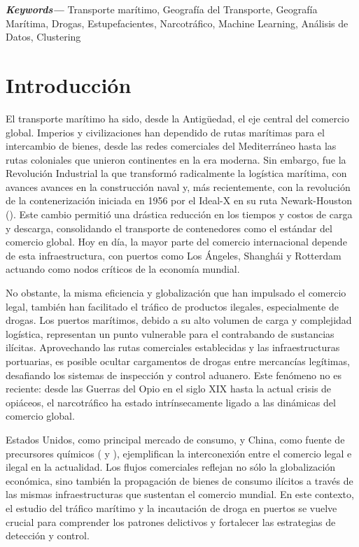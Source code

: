 \documentclass[12pt]{article}
\providecommand{\keywords}[1]
{
	\small	
	\textbf{\textit{Keywords---}} #1
}
\begin{document}
\keywords{Transporte marítimo, Geografía del Transporte, Geografía Marítima, Drogas, Estupefacientes, Narcotráfico, Machine Learning, Análisis de Datos, Clustering}

\newpage
\tableofcontents

\newpage

\listoffigures

\newpage

\listoftables

\newpage

\section{\label{intro}Introducción}
	El transporte marítimo ha sido, desde la Antigüedad, el eje central del comercio global. Imperios y civilizaciones han dependido de rutas marítimas para el intercambio de bienes, desde las redes comerciales del Mediterráneo hasta las rutas coloniales que unieron continentes en la era moderna. Sin embargo, fue la Revolución Industrial la que transformó radicalmente la logística marítima, con avances avances en la construcción naval y, más recientemente, con la revolución de la contenerización iniciada en 1956 por el Ideal-X en su ruta Newark-Houston (\cite{wired2012container}). Este cambio permitió una drástica reducción en los tiempos y costos de carga y descarga, consolidando el transporte de contenedores como el estándar del comercio global. Hoy en día, la mayor parte del comercio internacional depende de esta infraestructura, con puertos como Los Ángeles, Shanghái y Rotterdam actuando como nodos críticos de la economía mundial.
	
	No obstante, la misma eficiencia y globalización que han impulsado el comercio legal, también han facilitado el tráfico de productos ilegales, especialmente de drogas. Los puertos marítimos, debido a su alto volumen de carga y complejidad logística, representan un punto vulnerable para el contrabando de sustancias ilícitas. Aprovechando las rutas comerciales establecidas y las infraestructuras portuarias, es posible ocultar cargamentos de drogas entre mercancías legítimas, desafiando los sistemas de inspección y control aduanero. Este fenómeno no es reciente: desde las Guerras del Opio en el siglo XIX hasta la actual crisis de opiáceos, el narcotráfico ha estado intrínsecamente ligado a las dinámicas del comercio global.
	
	Estados Unidos, como principal mercado de consumo, y China, como fuente de precursores químicos (\cite{justice2023indictments} y \cite{justice2023fentanyl}), ejemplifican la interconexión entre el comercio legal e ilegal en la actualidad. Los flujos comerciales reflejan no sólo la globalización económica, sino también la propagación de bienes de consumo ilícitos a través de las mismas infraestructuras que sustentan el comercio mundial. En este contexto, el estudio del tráfico marítimo y la incautación de droga en puertos se vuelve crucial para comprender los patrones delictivos y fortalecer las estrategias de detección y control.
	
\end{document}
